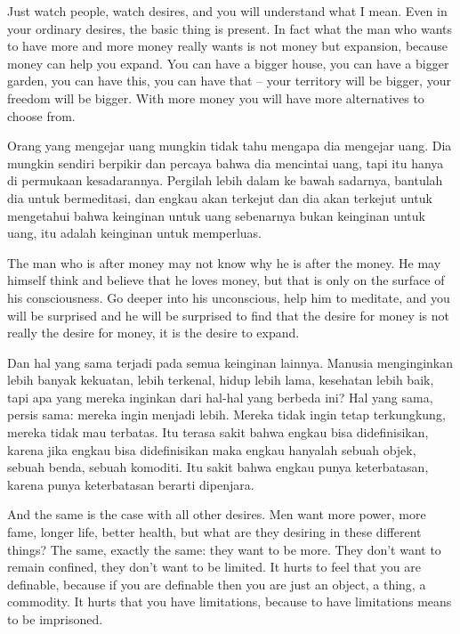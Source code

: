 \english
Just watch people, watch desires, and you will understand what I mean. Even in your ordinary desires, the basic thing is present. In fact what the man who wants to have more and more money really wants is not money but expansion, because money can help you expand. You can have a bigger house, you can have a bigger garden, you can have this, you can have that -- your territory will be bigger, your freedom will be bigger. With more money you will have more alternatives to choose from.

\bahasa
Orang yang mengejar uang mungkin tidak tahu mengapa dia mengejar uang. Dia mungkin sendiri berpikir dan percaya bahwa dia mencintai uang, tapi itu hanya di permukaan kesadarannya. Pergilah lebih dalam ke bawah sadarnya, bantulah dia untuk bermeditasi, dan engkau akan terkejut dan dia akan terkejut untuk mengetahui bahwa keinginan untuk uang sebenarnya bukan keinginan untuk uang, itu adalah keinginan untuk memperluas.

\english
The man who is after money may not know why he is after the money. He may himself think and believe that he loves money, but that is only on the surface of his consciousness. Go deeper into his unconscious, help him to meditate, and you will be surprised and he will be surprised to find that the desire for money is not really the desire for money, it is the desire to expand.

\bahasa
Dan hal yang sama terjadi pada semua keinginan lainnya. Manusia menginginkan lebih banyak kekuatan, lebih terkenal, hidup lebih lama, kesehatan lebih baik, tapi apa yang mereka inginkan dari hal-hal yang berbeda ini? Hal yang sama, persis sama: mereka ingin menjadi lebih. Mereka tidak ingin tetap terkungkung, mereka tidak mau terbatas. Itu terasa sakit bahwa engkau bisa didefinisikan, karena jika engkau bisa didefinisikan maka engkau hanyalah sebuah objek, sebuah benda, sebuah komoditi. Itu sakit bahwa engkau punya keterbatasan, karena punya keterbatasan berarti dipenjara.

\english
And the same is the case with all other desires. Men want more power, more fame, longer life, better health, but what are they desiring in these different things? The same, exactly the same: they want to be more. They don't want to remain confined, they don't want to be limited. It hurts to feel that you are definable, because if you are definable then you are just an object, a thing, a commodity. It hurts that you have limitations, because to have limitations means to be imprisoned.


